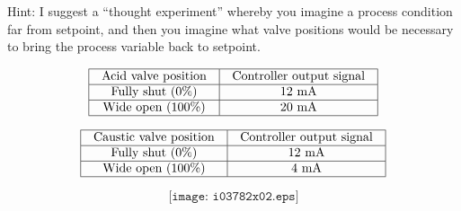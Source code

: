 





Hint: I suggest a ``thought experiment'' whereby you imagine a process condition far from setpoint, and then you imagine what valve positions would be necessary to bring the process variable back to setpoint.








$$\vbox{\offinterlineskip
\halign{\strut
\vrule \quad\hfil # \ \hfil & 
\vrule \quad\hfil # \ \hfil \vrule \cr
\noalign{\hrule}
%
Acid valve position & Controller output signal \cr
%
\noalign{\hrule}
%
Fully shut (0\%) & 12 mA \cr
%
\noalign{\hrule}
%
Wide open (100\%) & 20 mA \cr
%
\noalign{\hrule}
} %
}$$ %


$$\vbox{\offinterlineskip
\halign{\strut
\vrule \quad\hfil # \ \hfil & 
\vrule \quad\hfil # \ \hfil \vrule \cr
\noalign{\hrule}
%
Caustic valve position & Controller output signal \cr
%
\noalign{\hrule}
%
Fully shut (0\%) & 12 mA \cr
%
\noalign{\hrule}
%
Wide open (100\%) & 4 mA \cr
%
\noalign{\hrule}
} %
}$$ %

$$\texttt{[image: i03782x02.eps]}$$





